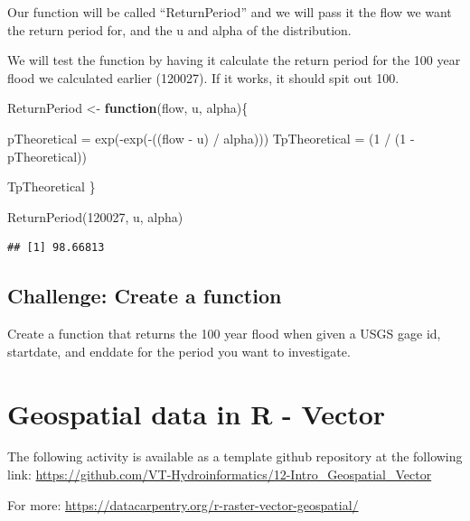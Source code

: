 \documentclass[
]{book}
\newenvironment{Shaded}{\begin{snugshade}}{\end{snugshade}}
\newcommand{\ControlFlowTok}[1]{\textcolor[rgb]{0.13,0.29,0.53}{\textbf{#1}}}
\newcommand{\DecValTok}[1]{\textcolor[rgb]{0.00,0.00,0.81}{#1}}
\newcommand{\FunctionTok}[1]{\textcolor[rgb]{0.00,0.00,0.00}{#1}}
\newcommand{\NormalTok}[1]{#1}
\newcommand{\OtherTok}[1]{\textcolor[rgb]{0.56,0.35,0.01}{#1}}
\newcommand{\SpecialCharTok}[1]{\textcolor[rgb]{0.00,0.00,0.00}{#1}}
\begin{document}
Our function will be called ``ReturnPeriod'' and we will pass it the flow we want the return period for, and the u and alpha of the distribution.

We will test the function by having it calculate the return period for the 100 year flood we calculated earlier (120027). If it works, it should spit out 100.

\begin{Shaded}
\begin{Highlighting}[]
\NormalTok{ReturnPeriod }\OtherTok{\textless{}{-}} \ControlFlowTok{function}\NormalTok{(flow, u, alpha)\{}
  
\NormalTok{  pTheoretical }\OtherTok{=} \FunctionTok{exp}\NormalTok{(}\SpecialCharTok{{-}}\FunctionTok{exp}\NormalTok{(}\SpecialCharTok{{-}}\NormalTok{((flow }\SpecialCharTok{{-}}\NormalTok{ u) }\SpecialCharTok{/}\NormalTok{ alpha)))}
\NormalTok{  TpTheoretical }\OtherTok{=}\NormalTok{ (}\DecValTok{1} \SpecialCharTok{/}\NormalTok{ (}\DecValTok{1} \SpecialCharTok{{-}}\NormalTok{ pTheoretical))}
  
\NormalTok{  TpTheoretical}
\NormalTok{\}}

\FunctionTok{ReturnPeriod}\NormalTok{(}\DecValTok{120027}\NormalTok{, u, alpha)}
\end{Highlighting}
\end{Shaded}

\begin{verbatim}
## [1] 98.66813
\end{verbatim}

\hypertarget{challenge-create-a-function}{%
\section{Challenge: Create a function}\label{challenge-create-a-function}}

Create a function that returns the 100 year flood when given a USGS gage id, startdate, and enddate for the period you want to investigate.

\hypertarget{rgeospatial}{%
\chapter{Geospatial data in R - Vector}\label{rgeospatial}}

The following activity is available as a template github repository at the following link: \url{https://github.com/VT-Hydroinformatics/12-Intro_Geospatial_Vector}

For more: \url{https://datacarpentry.org/r-raster-vector-geospatial/}
\end{document}
